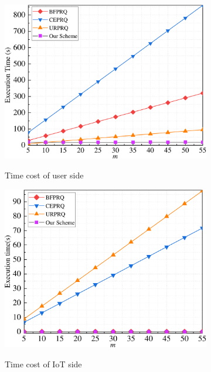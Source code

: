\documentclass[IEEE JOURNAL OF BIOMEDICAL AND HEALTH INFORMATICS]{IEEEtran}
\begin{document}
\begin{figure}%
	\centering
	\begin{subfigure}[t]{0.3\textwidth}
		\centering
		\includegraphics[width=1\textwidth]{com_1m}\\
		\caption{Time cost of user side}\label{com_1m}	
	\end{subfigure}
	\quad
	\begin{subfigure}[t]{0.3\textwidth}
		\centering
		\includegraphics[width=1\textwidth]{com_2m}\\
		\caption{Time cost of IoT side}\label{com_2m}
	\end{subfigure}
	\quad
	\begin{subfigure}[t]{0.3\textwidth}

\end{subfigure}
\end{figure}
\end{document}
